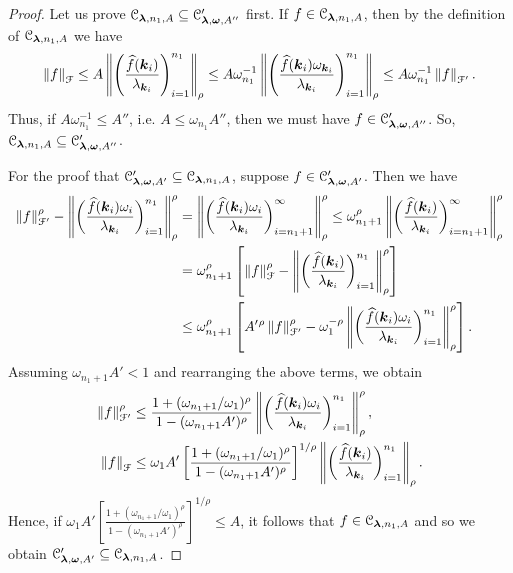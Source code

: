 \documentclass[USenglish]{article}
\theoremstyle{dgthm}
\theoremstyle{dgthm}
\theoremstyle{dgthm}
\theoremstyle{dgthm}
\theoremstyle{dgdef}
\theoremstyle{definition}
\newcommand{\hf}{\widehat{f}}
\newcommand{\norm}[2][{}]{\ensuremath{\left \lVert #2 \right \rVert}_{#1}}
\begin{document}
\begin{proof}
Let us prove $
{\mathcal{C}}_{\boldsymbol{\lambda}, n_1, A} \subseteq {\mathcal{C}}'_{\boldsymbol{\lambda}, \boldsymbol{\omega}, A''}$ first.
If $f \in {\mathcal{C}}_{\boldsymbol{\lambda}, n_1, A}$, then by the definition of ${\mathcal{C}}_{\boldsymbol{\lambda}, n_1, A}$ we have
\begin{equation*}
    \norm[\calF]{f} \le A \norm[\rho]{\left( \frac{\hf(\bsk_i)}{\lambda_{\bsk_i}} \right)_{i = 1} ^{ n_1}}
     \le A \omega_{n_1}^{-1} \norm[\rho]{\left( \frac{\hf(\bsk_i)\omega_{\bsk_i}}{\lambda_{\bsk_i}} \right)_{i =1} ^{n_1}}
     \le A \omega_{n_1}^{-1} \norm[\calF']{f}.
\end{equation*}
Thus, if $A\omega_{n_1}^{-1} \le A''$, i.e. $A \le \omega_{n_1} A'' $, then
we must have $f \in {\mathcal{C}}'_{\boldsymbol{\lambda}, \boldsymbol{\omega}, A''}$.  So, $
{\mathcal{C}}_{\boldsymbol{\lambda}, n_1, A} \subseteq {\mathcal{C}}'_{\boldsymbol{\lambda}, \boldsymbol{\omega}, A''}$.

For the proof that 
${\mathcal{C}}'_{\boldsymbol{\lambda}, \boldsymbol{\omega}, A'}
\subseteq 
{\mathcal{C}}_{\boldsymbol{\lambda}, n_1, A}$, 
suppose $f \in {\mathcal{C}}'_{\boldsymbol{\lambda},\boldsymbol{\omega},  A'}$. Then we have
\begin{align*}
    \norm[\calF']{f}^\rho- \norm[\rho]{\biggl ( \frac{\hf(\bsk_i) \omega_i }{\lambda_{\bsk_i}} \biggr) _{i=1}^{n_1}}^\rho 
	& = \norm[\rho]{\biggl ( \frac{\hf(\bsk_i) \omega_i }{\lambda_{\bsk_i}} \biggr) _{i=n_1 + 1}^{\infty}}^\rho 
     \le \omega_{n_1+1}^\rho \norm[\rho]{\biggl ( \frac{\hf(\bsk_i) }{\lambda_{\bsk_i}} \biggr) _{i=n_1 + 1}^{\infty}}^\rho \\
     & = \omega_{n_1+1}^\rho \left[ \norm[\calF]{f}^\rho - \norm[\rho]{\biggl ( \frac{\hf(\bsk_i) }{\lambda_{\bsk_i}} \biggr) _{i=1}^{n_1}}^\rho \right ]\\	
     & \le \omega_{n_1+1}^\rho \left[ A'{}^\rho \norm[\calF']{f}^\rho - \omega_1^{-\rho} \norm[\rho]{\biggl ( \frac{\hf(\bsk_i) \omega_i}{\lambda_{\bsk_i}} \biggr) _{i=1}^{n_1}}^\rho \right ].
\end{align*}
Assuming $\omega_{n_1+1}A' < 1$ and rearranging the above terms, we obtain
\begin{align*}
\norm[\calF']{f}^\rho & \le \frac{1 + (\omega_{n_1+1}/\omega_1)^\rho}{1 - (\omega_{n_1+1}A')^\rho} \norm[\rho]{\biggl ( \frac{\hf(\bsk_i) \omega_i }{\lambda_{\bsk_i}} \biggr) _{i=1}^{n_1}}^\rho, \\
	\norm[\calF]{f} & \le \omega_1A'\left[\frac{1 + (\omega_{n_1+1}/\omega_1)^\rho}{1 - (\omega_{n_1+1}A')^\rho}\right]^{1/\rho} \norm[\rho]{\biggl ( \frac{\hf(\bsk_i)}{\lambda_{\bsk_i}} \biggr) _{i=1}^{n_1}}.
\end{align*}
Hence, if $\omega_1A'\left[\frac{1 + (\omega_{n_1+1}/\omega_1)^\rho}{1 - (\omega_{n_1+1}A')^\rho}\right]^{1/\rho} \le A$, it follows that $f \in {\mathcal{C}}_{\boldsymbol{\lambda}, n_1, A}$ and so
we obtain $
{\mathcal{C}}'_{\boldsymbol{\lambda}, \boldsymbol{\omega}, A'}
\subseteq
{\mathcal{C}}_{\boldsymbol{\lambda}, n_1, A}
$.
\end{proof}
\end{document}
